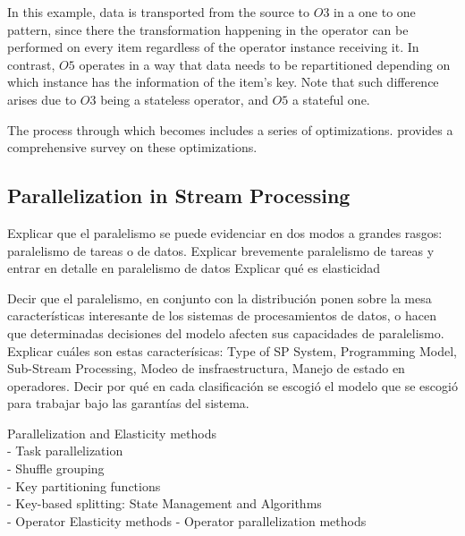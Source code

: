 
  In this example, data is transported from the source to $O3$ in a one to one
  pattern, since there the transformation happening in the operator can be
  performed on every item regardless of the operator instance receiving it. In
  contrast, $O5$ operates in a way that data needs to be repartitioned depending on which instance has the information of the item's key. Note that such difference arises due to $O3$ being a stateless operator, and $O5$ a stateful one.

  The process through which  becomes 
  includes a series of optimizations. \cite{Hirzel_2014} provides a
  comprehensive survey on these optimizations.

  \subsection{Parallelization in Stream Processing}

  Explicar que el paralelismo se puede evidenciar en dos modos a grandes
  rasgos: paralelismo de tareas o de datos. Explicar brevemente paralelismo de
  tareas y entrar en detalle en paralelismo de datos
  Explicar qué es elasticidad

  Decir que el paralelismo, en conjunto con la distribución ponen sobre la mesa
  características interesante de los sistemas de procesamientos de datos, o
  hacen que determinadas decisiones del modelo afecten sus capacidades de
  paralelismo. Explicar cuáles son estas caracterísicas: Type of SP System,
  Programming Model, Sub-Stream Processing, Modeo de insfraestructura, Manejo
  de estado en operadores. \cite{R_ger_2019} Decir por qué en cada
  clasificación se escogió el modelo que se escogió para trabajar bajo las
  garantías del sistema.


  Parallelization and Elasticity methods \cite{R_ger_2019}\\
  - Task parallelization \cite{R_ger_2019}\\
  - Shuffle grouping \cite{R_ger_2019}\\
  - Key partitioning functions \cite{R_ger_2019}\\
  - Key-based splitting: State Management and Algorithms \cite{R_ger_2019}\\
  - Operator Elasticity methods \cite{R_ger_2019}
  - Operator parallelization methods \cite{R_ger_2019}

